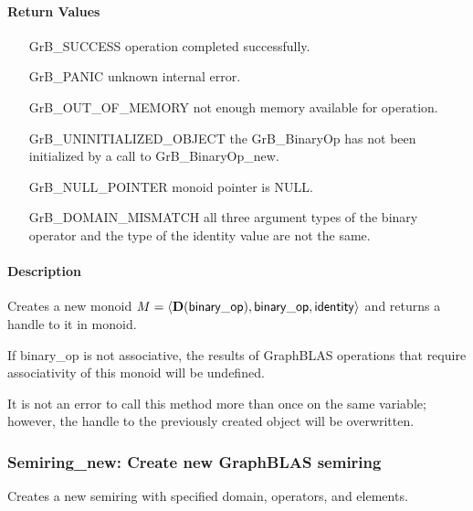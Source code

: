 \paragraph{Return Values}

\begin{itemize}[leftmargin=2.1in]
\item[{\sf GrB\_SUCCESS}]           operation completed successfully.
\item[{\sf GrB\_PANIC}]             unknown internal error.
\item[{\sf GrB\_OUT\_OF\_MEMORY}]   not enough memory available for operation.
\item[{\sf GrB\_UNINITIALIZED\_OBJECT}]  the {\sf GrB\_BinaryOp} has not been
                                    initialized by a call to {\sf GrB\_BinaryOp\_new}.
\item[{\sf GrB\_NULL\_POINTER}]     {\sf monoid} pointer is {\sf NULL}.
\item[{\sf GrB\_DOMAIN\_MISMATCH}]  all three argument types of the binary operator and
                                    the type of the identity value are not the same.
\end{itemize}

\paragraph{Description}

Creates a new monoid $M = \langle \mathbf{D}({\sf binary\_op}), {\sf binary\_op}, 
{\sf identity} \rangle$ and returns a handle to it in {\sf monoid}.

If {\sf binary\_op} is not associative, the results of GraphBLAS operations that
require associativity of this monoid will be undefined.

It is not an error to call this method more than once on the same variable;  
however, the handle to the previously created object will be overwritten. 

\subsubsection{{\sf Semiring\_new}: Create new GraphBLAS semiring}

Creates a new semiring with specified domain, operators, and elements.

\paragraph{\syntax}

